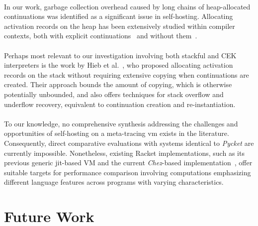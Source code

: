         \paragraph{}%
            In our work, garbage collection overhead caused by long chains of heap-allocated continuations was identified as a significant issue in self-hosting. Allocating activation records on the heap has been extensively studied within compiler contexts, both with explicit continuations~\cite{comp-cont:92} and without them~\cite{comp-without-cont:17,whatever:19}.

        \paragraph{}%
            Perhaps most relevant to our investigation involving both stackful and CEK interpreters is the work by Hieb et al.~\cite{cont-heap-stack:90}, who proposed allocating activation records on the stack without requiring extensive copying when continuations are created. Their approach bounds the amount of copying, which is otherwise potentially unbounded, and also offers techniques for stack overflow and underflow recovery, equivalent to continuation creation and re-instantiation.

        \paragraph{}%
            To our knowledge, no comprehensive synthesis addressing the challenges and opportunities of self-hosting on a meta-tracing \gls{vm} exists in the literature. Consequently, direct comparative evaluations with systems identical to \emph{Pycket} are currently impossible. Nonetheless, existing Racket implementations, such as its previous generic \gls{jit}-based VM and the current \emph{Chez}-based implementation~\cite{icfp2019}, offer suitable targets for performance comparison involving computations emphasizing different language features across programs with varying characteristics.


    \section[\texorpdfstring{Future Work}{Future Work}]{Future Work}

